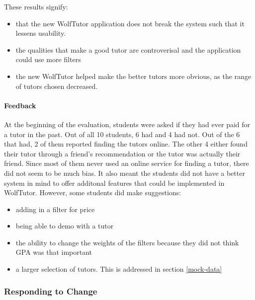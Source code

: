 These results signify: 
\begin{itemize}
  \item that the new WolfTutor application does not break the system such that it lessens usability.
  \item the qualities that make a good tutor are controverisal and the application could use more filters
  \item the new WolfTutor helped make the better tutors more obvious, as the range of tutors chosen decreased.
\end{itemize}


\paragraph{Feedback}
At the beginning of the evaluation, students were asked if they had ever paid for a tutor in the past. Out of all 10 students,
6 had and 4 had not. Out of the 6 that had, 2 of them reported finding the tutors online. The other
4 either found their tutor through a friend's recommendation or the tutor was actually their friend. Since most
of them never used an online service for finding a tutor, there did not seem to be much bias. It also meant
the students did not have a better system in mind to offer additonal features that could be implemented in WolfTutor.
However, some students did make suggestions:
\begin{itemize}
  \item adding in a filter for price
  \item being able to demo with a tutor
  \item the ability to change the weights of the filters because they did not think GPA was that important
  \item a larger selection of tutors. This is addressed in section \ref{mock-data}
\end{itemize}



\subsubsection{Responding to Change}
\label{sec:change}
